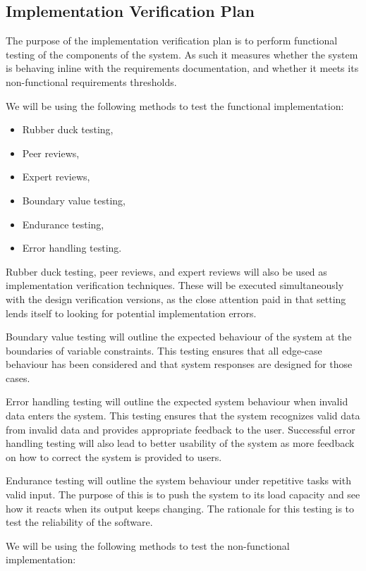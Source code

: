 \documentclass[12pt, titlepage]{article}
\begin{document}
\subsection{Implementation Verification Plan}
The purpose of the implementation verification plan is to perform functional 
testing of the components of the system. As such it measures whether the system 
is behaving inline with the requirements documentation, and whether it meets 
its non-functional requirements thresholds.

We will be using the following methods to test the functional implementation:

\begin{itemize}
	\item Rubber duck testing,
	\item Peer reviews,
	\item Expert reviews,
	\item Boundary value testing,
	\item Endurance testing,
	\item Error handling testing.
\end{itemize}

Rubber duck testing, peer reviews, and expert reviews will also be used as 
implementation verification techniques. These will be executed simultaneously 
with the design verification versions, as the close attention paid in that 
setting lends itself to looking for potential implementation errors.

Boundary value testing will outline the expected behaviour of the system at the 
boundaries of variable constraints. This testing ensures that all edge-case 
behaviour has been considered and that system responses are designed for those 
cases.

Error handling testing will outline the expected system behaviour when invalid 
data enters the system. This testing ensures that the system recognizes valid 
data from invalid data and provides appropriate feedback to the user. 
Successful error handling testing will also lead to better usability of the 
system as more feedback on how to correct the system is provided to users.

Endurance testing will outline the system behaviour under repetitive tasks with 
valid input. The purpose of this is to push the system to its load capacity and 
see how it reacts when its output keeps changing. The rationale for this 
testing is to test the reliability of the software.

We will be using the following methods to test the non-functional 
implementation:
\end{document}
